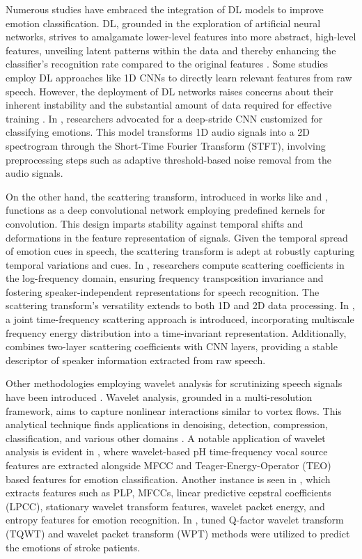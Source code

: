 Numerous studies have embraced the integration of DL models to improve emotion classification. DL, grounded in the exploration of artificial neural networks, strives to amalgamate lower-level features into more abstract, high-level features, unveiling latent patterns within the data and thereby enhancing the classifier's recognition rate compared to the original features \cite{schuller2003hidden}. Some studies employ DL approaches like 1D CNNs to directly learn relevant features from raw speech. However, the deployment of DL networks raises concerns about their inherent instability and the substantial amount of data required for effective training \cite{rolnick2017deep}. In \cite{mustaqeem2019cnn}, researchers advocated for a deep-stride CNN customized for classifying emotions. This model transforms 1D audio signals into a 2D spectrogram through the Short-Time Fourier Transform (STFT), involving preprocessing steps such as adaptive threshold-based noise removal from the audio signals.

On the other hand, the scattering transform, introduced in works like \cite{mallat2010recursive} and \cite{mallat2012group}, functions as a deep convolutional network employing predefined kernels for convolution. This design imparts stability against temporal shifts and deformations in the feature representation of signals. Given the temporal spread of emotion cues in speech, the scattering transform is adept at robustly capturing temporal variations and cues. In \cite{anden2014deep}, researchers compute scattering coefficients in the log-frequency domain, ensuring frequency transposition invariance and fostering speaker-independent representations for speech recognition. The scattering transform's versatility extends to both 1D and 2D data processing. In \cite{anden2019joint}, a joint time-frequency scattering approach is introduced, incorporating multiscale frequency energy distribution into a time-invariant representation. Additionally, \cite{ghezaiel2021hybrid} combines two-layer scattering coefficients with CNN layers, providing a stable descriptor of speaker information extracted from raw speech.

Other methodologies employing wavelet analysis for scrutinizing speech signals have been introduced \cite{silva2009discriminative}. Wavelet analysis, grounded in a multi-resolution framework, aims to capture nonlinear interactions similar to vortex flows. This analytical technique finds applications in denoising, detection, compression, classification, and various other domains \cite{rao2018discrete} \cite{daubechies1990wavelet}. A notable application of wavelet analysis is evident in \cite{zao2014time}, where wavelet-based pH time-frequency vocal source features are extracted alongside MFCC and Teager-Energy-Operator (TEO) based features for emotion classification. Another instance is seen in \cite{muthusamy2015particle}, which extracts features such as PLP, MFCCs, linear predictive cepstral coefficients (LPCC), stationary wavelet transform features, wavelet packet energy, and entropy features for emotion recognition. In \cite{zheng2018effectiveness}, tuned Q-factor wavelet transform (TQWT) and wavelet packet transform (WPT) methods were utilized to predict the emotions of stroke patients.

